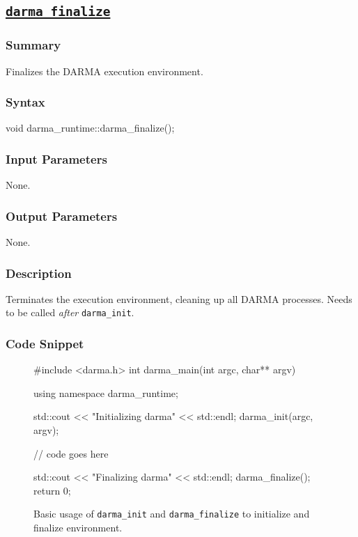 

\clearpage

\subsection{\underline{\texttt{darma\_finalize}}}
\label{ssec:api_fe_finalize}

\hspace{0.1cm} %
\begin{subs}
\vspace{-1.2cm}

\subsubsection{Summary} 
Finalizes the DARMA execution environment.

\subsubsection{Syntax} 
\begin{CppCode}
void darma_runtime::darma_finalize();
\end{CppCode}

\subsubsection{Input Parameters} 
None. 

\subsubsection{Output Parameters} 
None. 

\subsubsection{Description} 
Terminates the execution environment, cleaning up all DARMA processes.
Needs to be called {\it after} \texttt{darma\_init}.


\subsubsection{Code Snippet} 
\begin{figure}[!h]
\begin{CppCodeNumb}
#include <darma.h>
int darma_main(int argc, char** argv)
{
  using namespace darma_runtime;

  std::cout << "Initializing darma" << std::endl;
  darma_init(argc, argv);

  // code goes here

  std::cout << "Finalizing darma" << std::endl;
  darma_finalize();
  return 0;
}
\end{CppCodeNumb}
\label{fig:fe_api_init}
\caption{Basic usage of \texttt{darma\_init} and \texttt{darma\_finalize} 
to initialize and finalize environment.}
\end{figure}

\end{subs}





